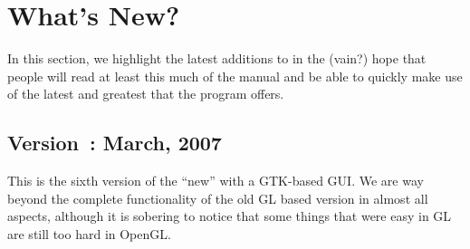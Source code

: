 \section{What's New?}
\label{sec:new-features} 

In this section, we highlight the latest additions to \map{} in the
(vain?) hope that people will read at least this much of the manual
and be able to quickly make use of the latest and greatest that the program
offers.

\subsection{Version~\version{}: March, 2007}

This is the sixth version of the ``new'' \map{} with a GTK-based GUI.  We
are way beyond the complete functionality of the old GL
based version in almost all aspects, although it is sobering to notice that
some things that were easy in GL are still too hard in OpenGL. 

